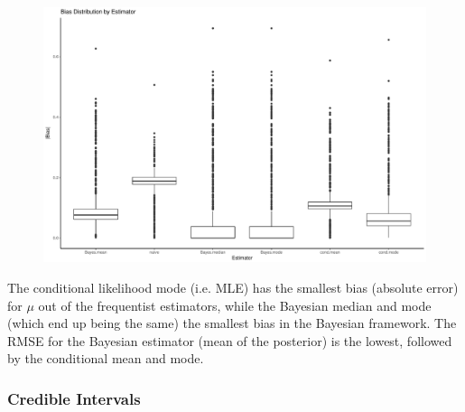 \documentclass[AMA,STIX1COL]{WileyNJD-v2}\usepackage[]{graphicx}\usepackage[]{color}
\newenvironment{knitrout}{}{} %
\begin{document}
\begin{figure}
\begin{knitrout}
\color{fgcolor}

{\centering \includegraphics[width=6in]{figure/unnamed-chunk-9-1} 

}



\end{knitrout}
\end{figure}

The conditional likelihood mode (i.e. MLE) has the smallest bias (absolute error) for $\mu$ out of the frequentist estimators, while the Bayesian median and mode (which end up being the same) the smallest bias in the Bayesian framework. The RMSE for the Bayesian estimator (mean of the posterior) is the lowest, followed by the conditional mean and mode.

\subsubsection{Credible Intervals}
\end{document}
